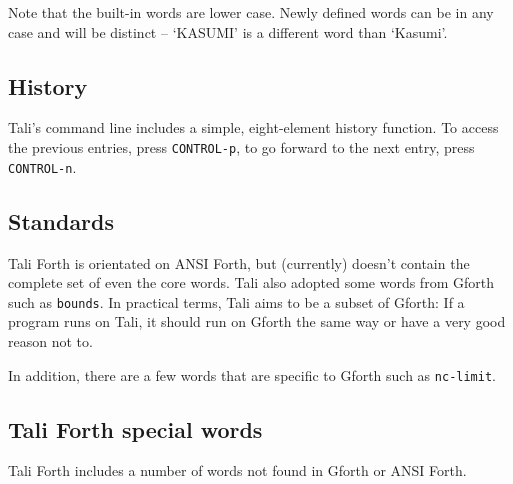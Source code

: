 Note that the built-in words are lower case. Newly defined
words can be in any case and will be distinct -- `KASUMI' is a different word
than `Kasumi'.


\subsection{History}

Tali's command line includes a simple, eight-element history function. To
access the previous entries, press \texttt{CONTROL-p}, to go forward to the next
entry, press \texttt{CONTROL-n}. 


\subsection{Standards}

Tali Forth is orientated on ANSI Forth, but (currently) doesn't contain the
complete set of even the core words. Tali also adopted some words from
Gforth such as \texttt{bounds}. In
practical terms, Tali aims to be a subset of Gforth: If a program runs on Tali,
it should run on Gforth the same way or have a very good reason not to. 

In addition, there are a few words that are specific to Gforth such as 
\texttt{nc-limit}. 


\subsection{Tali Forth special words}

Tali Forth includes a number of words not found in Gforth or ANSI Forth. 

